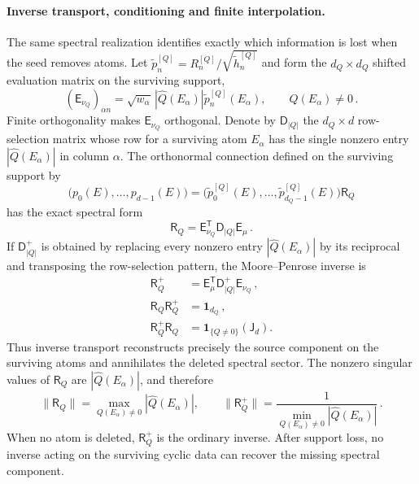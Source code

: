 \documentclass[a4paper,11pt]{article}
\theoremstyle{definition}
\theoremstyle{remark}
\newcommand{\Id}{\mathbf 1}
\newcommand{\thh}{\widetilde h}
\newcommand{\Qhat}{\widehat Q}
\begin{document}
\paragraph{Inverse transport, conditioning and finite interpolation.}
The same spectral realization identifies exactly which information is
lost when the seed removes atoms.  Let
$\widetilde p_n^{[Q]}=R_n^{[Q]}/\sqrt{\thh_n^{[Q]}}$ and form the
$d_Q\times d_Q$ shifted evaluation matrix on the surviving support,
\begin{equation}
   (\mathsf E_{\nu_Q})_{\alpha n}
   =\sqrt{w_\alpha}\,|\Qhat(E_\alpha)|
      \widetilde p_n^{[Q]}(E_\alpha),
   \qquad Q(E_\alpha)\ne0\,.
\end{equation}
Finite orthogonality makes $\mathsf E_{\nu_Q}$ orthogonal.  Denote by
$\mathsf D_{|Q|}$ the $d_Q\times d$ row-selection matrix whose row for a
surviving atom $E_\alpha$ has the single nonzero entry
$|\Qhat(E_\alpha)|$ in column $\alpha$.  The orthonormal connection
defined on the surviving support by
\begin{equation}
   \bigl(p_0(E),\ldots,p_{d-1}(E)\bigr)
   =\bigl(\widetilde p_0^{[Q]}(E),\ldots,
      \widetilde p_{d_Q-1}^{[Q]}(E)\bigr)\mathsf R_Q
\end{equation}
has the exact spectral form
\begin{equation}
   \mathsf R_Q
   =\mathsf E_{\nu_Q}^{\mathsf T}
      \mathsf D_{|Q|}\mathsf E_\mu\,.
   \label{eq:finite-orthonormal-connection-spectral-app}
\end{equation}
If $\mathsf D_{|Q|}^{+}$ is obtained by replacing every nonzero entry
$|\Qhat(E_\alpha)|$ by its reciprocal and transposing the
row-selection pattern, the Moore--Penrose inverse is
\begin{equation}
\begin{aligned}
   \mathsf R_Q^{+}
   &=\mathsf E_\mu^{\mathsf T}
      \mathsf D_{|Q|}^{+}\mathsf E_{\nu_Q}\,,\\
   \mathsf R_Q\mathsf R_Q^{+}&=\Id_{d_Q}\,,\\
   \mathsf R_Q^{+}\mathsf R_Q
   &=\boldsymbol 1_{\{Q\ne0\}}(\mathsf J_d).
\end{aligned}
   \label{eq:finite-connector-pseudoinverse-app}
\end{equation}
Thus inverse transport reconstructs precisely the source component on
the surviving atoms and annihilates the deleted spectral sector.  The
nonzero singular values of $\mathsf R_Q$ are
$|\Qhat(E_\alpha)|$, and therefore
\begin{equation}
   \|\mathsf R_Q\|
   =\max_{Q(E_\alpha)\ne0}|\Qhat(E_\alpha)|,
   \qquad
   \|\mathsf R_Q^{+}\|
   =\frac{1}{
      \min_{Q(E_\alpha)\ne0}|\Qhat(E_\alpha)|}\,.
   \label{eq:finite-connector-conditioning-app}
\end{equation}
When no atom is deleted, $\mathsf R_Q^{+}$ is the ordinary inverse.
After support loss, no inverse acting on the surviving cyclic data can
recover the missing spectral component.
\end{document}
